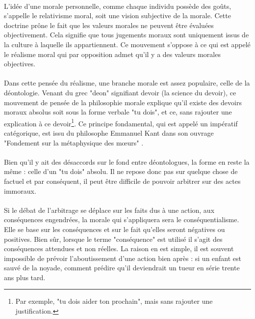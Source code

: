 \documentclass[10pt, french, a4paper]{article}
\begin{document}
\paragraph{}
L’idée d’une morale personnelle, comme chaque individu possède des goûts, s’appelle le relativisme moral, soit une vision subjective de la morale. Cette doctrine prône le fait que les valeurs morales ne peuvent être évaluées objectivement. Cela signifie que tous jugements moraux sont uniquement issus de la culture à laquelle ils appartiennent. Ce mouvement s’oppose à ce qui est appelé le réalisme moral qui par opposition admet qu’il y a des valeurs morales objectives.

\paragraph{}
Dans cette pensée du réalisme, une branche morale est assez populaire, celle de la déontologie. Venant du grec "deon" signifiant devoir (la science du devoir), ce mouvement de pensée de la philosophie morale explique qu’il existe des devoirs moraux absolus soit sous la forme verbale "tu dois", et ce, sans rajouter une explication à ce devoir\footnote{Par exemple, "tu dois aider ton prochain", mais sans rajouter une justification.}. Ce principe fondamental, qui est appelé un impératif catégorique, est issu du philosophe Emmanuel Kant dans son ouvrage "Fondement sur la métaphysique des mœurs" \citep{kant_fondements_2007}.

\paragraph{}
Bien qu’il y ait des désaccords sur le fond entre déontologues, la forme en reste la même : celle d’un "tu dois" absolu. Il ne repose donc pas sur quelque chose de factuel et par conséquent, il peut être difficile de pouvoir arbitrer sur des actes immoraux.

\paragraph{}
Si le débat de l’arbitrage se déplace sur les faits dus à une action, aux conséquences engendrées, la morale qui s’appliquera sera le conséquentialisme. Elle se base sur les conséquences et sur le fait qu’elles seront négatives ou positives. Bien sûr, lorsque le terme "conséquence" est utilisé il s’agit des conséquences attendues et non réelles. La raison en est simple, il est souvent impossible de prévoir l’aboutissement d’une action bien après : si un enfant est sauvé de la noyade, comment prédire qu’il deviendrait un tueur en série trente ans plus tard.
\end{document}
